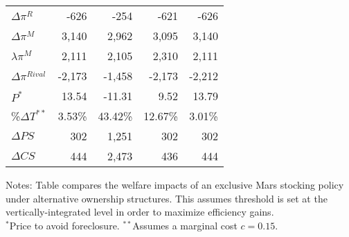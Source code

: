 \begin{frame}
\begin{table}[htbp]
\begin{center}
\begin{tabular}{|l | rrrr|}
 $\Delta \pi^R$ & -626 & -254 & -621 & -626 \\
$\Delta \pi^M$ & 3,140 & 2,962 & 3,095 & 3,140 \\
$\lambda \pi^M$ & 2,111 & 2,105 & 2,310 & 2,111 \\
$\Delta \pi^{Rival}$ & -2,173 & -1,458 & -2,173 & -2,212 \\ 
\hline
$P^*$ & 13.54 & -11.31 & 9.52 & 13.79 \\
\%$\Delta T^{**}$ & 3.53\% & 43.42\% & 12.67\% & 3.01\% \\
\hline
    $\Delta PS$  & 302   & 1,251 & 302   & 302 \\
    $\Delta CS$ & 444   & 2,473 & 436   & 444 \\
\hline
    \end{tabular}
\end{center}
\tiny
Notes: Table compares the welfare impacts of an exclusive Mars stocking policy under alternative ownership structures. This assumes threshold is set at the vertically-integrated level in order to maximize efficiency gains.\\
$^*$Price to avoid foreclosure.
$^{**}$Assumes a marginal cost $c=0.15.$\\
\end{table}
\end{frame}


